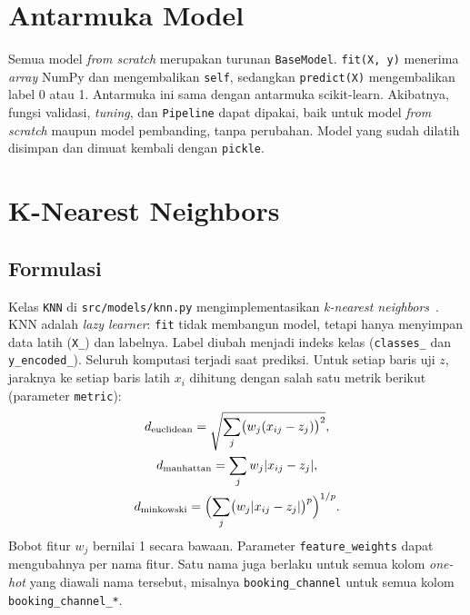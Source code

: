 \section{Antarmuka Model}

Semua model \textit{from scratch} merupakan turunan \texttt{BaseModel}.
\texttt{fit(X, y)} menerima \textit{array} NumPy dan mengembalikan \texttt{self},
sedangkan \texttt{predict(X)} mengembalikan label 0 atau 1. Antarmuka ini sama
dengan antarmuka scikit-learn. Akibatnya, fungsi validasi, \textit{tuning}, dan
\texttt{Pipeline} dapat dipakai, baik untuk model \textit{from scratch} maupun
model pembanding, tanpa perubahan. Model yang sudah dilatih disimpan dan dimuat
kembali dengan \texttt{pickle}.



\section{K-Nearest Neighbors}
\label{sec:knn}

\subsection{Formulasi}

Kelas \texttt{KNN} di \texttt{src/models/knn.py} mengimplementasikan
\textit{k-nearest neighbors}~\cite{kkif2026knn,cunningham2020knn}. KNN adalah
\textit{lazy learner}: \texttt{fit} tidak membangun model, tetapi hanya
menyimpan data latih (\texttt{X\_}) dan labelnya. Label diubah menjadi indeks
kelas (\texttt{classes\_} dan \texttt{y\_encoded\_}). Seluruh komputasi terjadi
saat prediksi. Untuk setiap baris uji $z$, jaraknya ke setiap baris latih $x_i$
dihitung dengan salah satu metrik berikut (parameter \texttt{metric}):
\begin{equation}
	\begin{gathered}
	d_{\text{euclidean}}=\sqrt{\sum_{j}\bigl(w_j(x_{ij}-z_j)\bigr)^2},\\
	d_{\text{manhattan}}=\sum_{j}w_j\lvert x_{ij}-z_j\rvert,\\
	d_{\text{minkowski}}=\Bigl(\sum_{j}\bigl(w_j\lvert x_{ij}-z_j\rvert\bigr)^p\Bigr)^{1/p}.
	\end{gathered}
\end{equation}
Bobot fitur $w_j$ bernilai 1 secara bawaan. Parameter \texttt{feature\_weights}
dapat mengubahnya per nama fitur. Satu nama juga berlaku untuk semua kolom
\textit{one-hot} yang diawali nama tersebut, misalnya \texttt{booking\_channel}
untuk semua kolom \texttt{booking\_channel\_*}.


